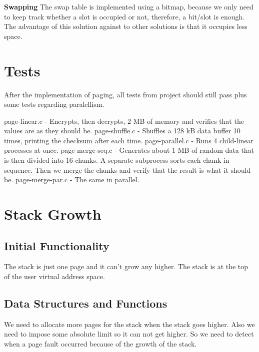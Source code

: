 \textbf{Swapping}
The swap table is implemented using a bitmap, because we only need to keep track whether a slot is occupied or not, therefore, a bit/slot is enough. 
The advantage of this solution against to other solutions is that it occupies less space.

\section{Tests}

After the implementation of paging, all tests from project should still pass plus some tests regarding paralellism.

page-linear.c - Encrypts, then decrypts, 2 MB of memory and verifies that the values are as they should be.
page-shuffle.c - Shuffles a 128 kB data buffer 10 times, printing the checksum after each time.
page-parallel.c - Runs 4 child-linear processes at once.
page-merge-seq.c - Generates about 1 MB of random data that is then divided into 16 chunks.  A separate subprocess sorts each chunk in sequence.  Then we merge the chunks and verify that the result is what it should be.
page-merge-par.c - The same in parallel.

\section{Stack Growth}
\subsection{Initial Functionality}

The stack is just one page and it can't grow any higher. The stack is at the top of the user
virtual address space.

\subsection{Data Structures and Functions}

We need to allocate more pages for the stack when the stack goes higher. Also we need to
impose some absolute limit so it can not get higher. So we need to detect when a page fault occurred because of the growth of the stack. 

